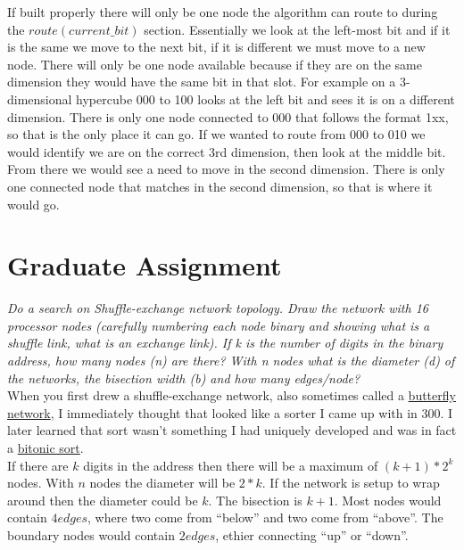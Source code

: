 \documentclass{article}
\begin{document}
If built properly there will only be one node the algorithm can route to during the $route(current\_bit)$ section. Essentially we look at the left-most bit and if it is the same we move to the next bit, if it is different we must move to a new node. There will only be one node available because if they are on the same dimension they would have the same bit in that slot. For example on a 3-dimensional hypercube 000 to 100 looks at the left bit and sees it is on a different dimension. There is only one node connected to 000 that follows the format 1xx, so that is the only place it can go. If we wanted to route from 000 to 010 we would identify we are on the correct 3rd dimension, then look at the middle bit. From there we would see a need to move in the second dimension. There is only one connected node that matches in the second dimension, so that is where it would go.


\newpage
\section{Graduate Assignment}
\textit{Do a search on Shuffle-exchange network topology.  
Draw the network with 16 processor nodes (carefully numbering each node binary and showing what is a shuffle link, what is an exchange link).  If k is the number of digits in the binary address, how many nodes (n) are there?  With n nodes what is the diameter (d) of the networks, the bisection width (b) and how many edges/node?}\\

When you first drew a shuffle-exchange network, also sometimes called a \href{https://en.wikipedia.org/wiki/Butterfly_network}{butterfly network}, I immediately thought that looked like a sorter I came up with in 300. I later learned that sort wasn't something I had uniquely developed and was in fact a \href{https://en.wikipedia.org/wiki/Bitonic_sorter}{bitonic sort}.\\

If there are $k$ digits in the address then there will be a maximum of $(k + 1) * 2^k$ nodes. With $n$ nodes the diameter will be $2 * k$. If the network is setup to wrap around then the diameter could be $k$. The bisection is $k + 1$. Most nodes would contain $4 edges$, where two come from ``below'' and two come from ``above''. The boundary nodes would contain $2 edges$, ethier connecting ``up'' or ``down''.
\end{document}
